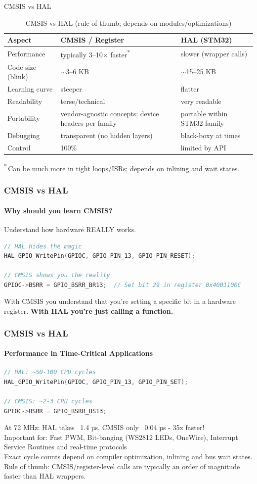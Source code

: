 \documentclass{beamer}
\begin{document}
\begin{frame}{CMSIS vs HAL}
	\begin{table}
		\footnotesize\centering
		\begin{tabular}{@{} l l l @{}}
			\toprule
			\textbf{Aspect} & \textbf{CMSIS / Register} & \textbf{HAL (STM32)} \\
			\midrule
			Performance & typically 3–10× faster\textsuperscript{*} & slower (wrapper calls) \\
			Code size (blink) & \(\sim\)3–6 KB & \(\sim\)15–25 KB \\
			Learning curve & steeper & flatter \\
			Readability & terse/technical & very readable \\
			Portability & vendor-agnostic concepts; device headers per family & portable within STM32 family \\
			Debugging & transparent (no hidden layers) & black-boxy at times \\
			Control & 100\% & limited by API \\
			\bottomrule
		\end{tabular}
		\caption{CMSIS vs HAL (rule-of-thumb; depends on modules/optimizations)}
	\end{table}
	
	\footnotesize\textsuperscript{*}\,Can be much more in tight loops/ISRs; depends on inlining and wait states.
	
\end{frame}
\begin{frame}[fragile]
	\frametitle{CMSIS vs HAL}
	\framesubtitle{Why should you learn CMSIS?}
	Understand how hardware REALLY works.
	\begin{lstlisting}[language=C]
// HAL hides the magic
HAL_GPIO_WritePin(GPIOC, GPIO_PIN_13, GPIO_PIN_RESET);
		
// CMSIS shows you the reality
GPIOC->BSRR = GPIO_BSRR_BR13;  // Set bit 29 in register 0x4001100C
	\end{lstlisting}
	With CMSIS you understand that you're setting a specific bit in a hardware register. \textbf{With HAL you're just calling a function.}
\end{frame}
\begin{frame}[fragile]
	\frametitle{CMSIS vs HAL}
	\framesubtitle{Performance in Time-Critical Applications}
	\begin{lstlisting}[language=C]
// HAL: ~50-100 CPU cycles
HAL_GPIO_WritePin(GPIOC, GPIO_PIN_13, GPIO_PIN_SET);
		
// CMSIS: ~2-3 CPU cycles
GPIOC->BSRR = GPIO_BSRR_BS13;
	\end{lstlisting}
	At 72 MHz: HAL takes ~1.4 µs, CMSIS only ~0.04 µs - 35x faster!\\
	\vspace{0.2cm}
	Important for: Fast PWM, Bit-banging (WS2812 LEDs, OneWire), Interrupt Service Routines and real-time protocols\\
	\vspace{0.2cm}
	\footnotesize{Exact cycle counts depend on compiler optimization, inlining and bus wait states.
		Rule of thumb: CMSIS/register-level calls are typically an order of magnitude faster than HAL wrappers.}
	
\end{frame}
\end{document}
